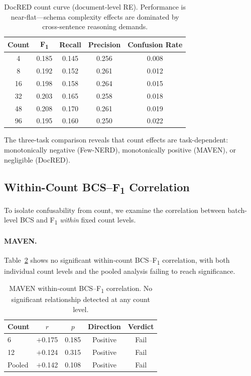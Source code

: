 \documentclass[11pt,a4paper]{article}
\newcommand{\fone}{F\textsubscript{1}}
\begin{document}
\begin{table}[t]
\centering
\caption{DocRED count curve (document-level RE). Performance is near-flat---schema complexity effects are dominated by cross-sentence reasoning demands.}
\label{tab:docred_count}
\small
\begin{tabular}{ccccc}
\toprule
\textbf{Count} & \textbf{\fone{}} & \textbf{Recall} & \textbf{Precision} & \textbf{Confusion Rate} \\
\midrule
4  & 0.185 & 0.145 & 0.256 & 0.008 \\
8  & 0.192 & 0.152 & 0.261 & 0.012 \\
16 & 0.198 & 0.158 & 0.264 & 0.015 \\
32 & 0.203 & 0.165 & 0.258 & 0.018 \\
48 & 0.208 & 0.170 & 0.261 & 0.019 \\
96 & 0.195 & 0.160 & 0.250 & 0.022 \\
\bottomrule
\end{tabular}
\end{table}

The three-task comparison reveals that count effects are task-dependent: monotonically negative (Few-NERD), monotonically positive (MAVEN), or negligible (DocRED).

\subsection{Within-Count BCS--\fone{} Correlation}
\label{sec:within_count}

To isolate confusability from count, we examine the correlation between batch-level BCS and \fone{} \emph{within} fixed count levels.

\paragraph{MAVEN.} Table~\ref{tab:maven_within_count} shows no significant within-count BCS--\fone{} correlation, with both individual count levels and the pooled analysis failing to reach significance.

\begin{table}[t]
\centering
\caption{MAVEN within-count BCS--\fone{} correlation. No significant relationship detected at any count level.}
\label{tab:maven_within_count}
\small
\begin{tabular}{lcccc}
\toprule
\textbf{Count} & \textbf{$r$} & \textbf{$p$} & \textbf{Direction} & \textbf{Verdict} \\
\midrule
6  & $+$0.175 & 0.185 & Positive & Fail \\
12 & $+$0.124 & 0.315 & Positive & Fail \\
Pooled & $+$0.142 & 0.108 & Positive & Fail \\
\bottomrule
\end{tabular}
\end{table}
\end{document}
